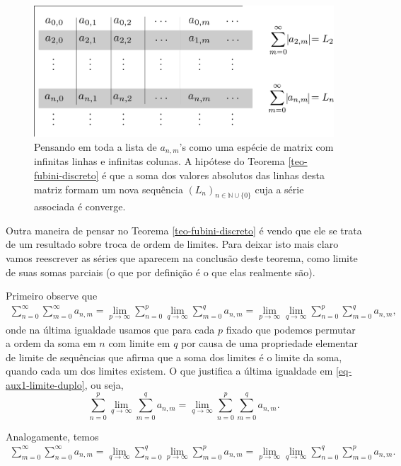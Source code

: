 \begin{figure}[H]
\centering
\includegraphics[width=0.75\linewidth]{Figuras/fubini-anm}
\caption{Pensando em toda a lista de $a_{n,m}$'s como uma espécie de matrix com infinitas linhas e infinitas colunas. A hipótese do Teorema \ref{teo-fubini-discreto} é que a soma dos valores absolutos das linhas desta matriz formam um nova sequência $(L_n)_{n\in\mathbb{N}\cup\{0\}}$ cuja a série associada é converge.}
\label{fig:fubini-anm}
\end{figure}


Outra maneira de pensar no Teorema \ref{teo-fubini-discreto} é vendo
que ele se trata de um resultado sobre troca de ordem de limites.
Para deixar isto mais claro vamos reescrever as séries
que aparecem na conclusão deste teorema, como limite de suas somas parciais 
(o que por definição é o que elas realmente são). 


Primeiro observe que
\begin{align}\label{eq-aux1-limite-duplo}
\sum_{n=0}^{\infty}\sum_{m=0}^{\infty}a_{n,m}
=
\lim_{p\to\infty}\sum_{n=0}^{p}\lim_{q\to\infty} \sum_{m=0}^{q}a_{n,m} 
=
\lim_{p\to\infty} \lim_{q\to\infty} \sum_{n=0}^{p} \sum_{m=0}^{q}a_{n,m}, 
\end{align}
onde na última igualdade usamos que para cada $p$ fixado que podemos
permutar a ordem da soma em $n$ com limite em $q$ por causa de uma propriedade
elementar de limite de sequências que afirma que a soma 
dos limites é o limite da soma,
quando cada um dos limites existem. O que justifica a última 
igualdade em \eqref{eq-aux1-limite-duplo}, ou seja,
\[
\sum_{n=0}^{p}\lim_{q\to\infty} \sum_{m=0}^{q}a_{n,m} 
=
\lim_{q\to\infty} \sum_{n=0}^{p}\sum_{m=0}^{q}a_{n,m}. 
\]
\bigskip 


Analogamente, temos 
\begin{align}\label{eq-aux2-limite-duplo}
\sum_{m=0}^{\infty}\sum_{n=0}^{\infty}a_{n,m}
=
\lim_{q\to\infty}\sum_{n=0}^{q}\lim_{p\to\infty} \sum_{m=0}^{p}a_{n,m} 
=
\lim_{p\to\infty} \lim_{q\to\infty} \sum_{n=0}^{q} \sum_{m=0}^{p}a_{n,m}. 
\end{align}

